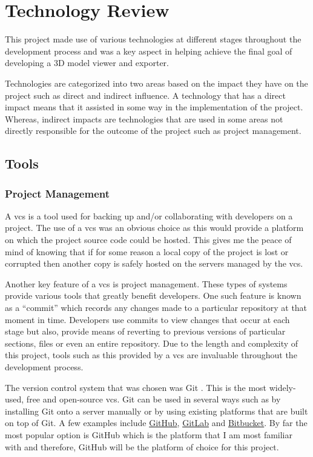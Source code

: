 \documentclass[11pt]{article}
\begin{document}
\clearpage
\section{Technology Review} \label{technology_review}
This project made use of various technologies at different stages throughout the
development process and was a key aspect in helping achieve the final goal of
developing a 3D model viewer and exporter.

Technologies are categorized into two areas based on the impact they have on the
project such as direct and indirect influence. A technology that has a direct
impact means that it assisted in some way in the implementation of the project.
Whereas, indirect impacts are technologies that are used in some areas not
directly responsible for the outcome of the project such as project management.

\subsection{Tools}
\subsubsection{Project Management} \label{project_management}
A \gls*{vcs} is a tool used for backing up and/or collaborating with developers
on a project. The use of a \gls*{vcs} was an obvious choice as this would provide
a platform on which the project source code could be hosted. This gives me the
peace of mind of knowing that if for some reason a local copy of the project is
lost or corrupted then another copy is safely hosted on the servers managed by
the \gls*{vcs}.

Another key feature of a \gls*{vcs} is project management. These types of systems
provide various tools that greatly benefit developers. One such feature is known
as a ``commit'' which records any changes made to a particular repository at
that moment in time. Developers use commits to view changes that occur at each
stage but also, provide means of reverting to previous versions of particular
sections, files or even an entire repository. Due to the length and complexity
of this project, tools such as this provided by a \gls*{vcs} are invaluable
throughout the development process.

The version control system that was chosen was Git \cite{gitvcs}. This is the
most widely-used, free and open-source \gls*{vcs}. Git can be used in several
ways such as by installing Git onto a server manually or by using existing
platforms that are built on top of Git. A few examples include
\href{http://github.com}{GitHub}, \href{http://gitlab.com}{GitLab} and
\href{https://bitbucket.org/}{Bitbucket}. By far the most popular option is
GitHub which is the platform that I am most familiar with and therefore, GitHub
will be the platform of choice for this project.
\end{document}
